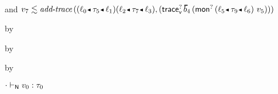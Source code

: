 {\begin{lamportproof*}
\begin{pfproof}
{      \) \\ and \(
        \rexpr{\svalue_7}{\faddtrace{\fconcat{\obnd{\sowner_0}{\stype_5}{\sowner_1}}{\obnd{\sowner_2}{\stype_7}{\sowner_3}}}{(\ehopt{\sblist_4}{(\emopt{\obnd{\sowner_5}{\stype_9}{\sowner_6}}{\svalue_5})})}}
      \)}
        \begin{pfproof}
          by 
        \end{pfproof}
      \qedstep
        \begin{pfproof}
          \begin{mathpar}
          \end{mathpar}
        \end{pfproof}
    \end{pfproof}

    \begin{pfproof}
      \absurdstep
        \begin{pfproof}
          by 
        \end{pfproof}
    \end{pfproof}

    \begin{pfproof}
      \absurdstep
        \begin{pfproof}
          by 
        \end{pfproof}
    \end{pfproof}

    \begin{pfproof}
      \absurdstep
        \begin{pfproof}
          $\snil \sWTN \svalue_0 : \stype_0$
        \end{pfproof}
    \end{pfproof}


\end{lamportproof*}}
